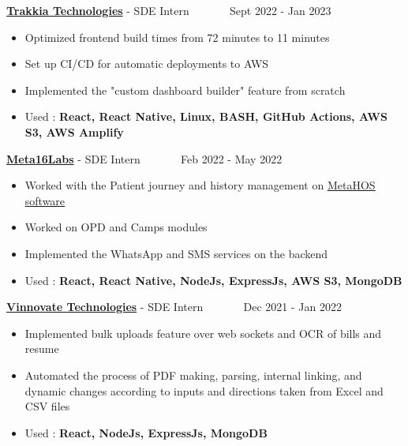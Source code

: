 \documentclass[10pt,a4paper,ragged2e,withhyper]{altacv}
\begin{document}
\begin{paracol}{2}


\large \textcolor{VividPurple}{\href{https://www.trakkia.com}{\textbf{Trakkia Technologies}}} - SDE Intern ~~~~~~ \normalsize \faCalendar Sept 2022 - Jan 2023

\begin{itemize}
  \item Optimized frontend build times from 72 minutes to 11 minutes 
  \item Set up CI/CD for automatic deployments to AWS
  \item Implemented the "custom dashboard builder" feature from scratch
  \item Used : \textcolor{VividPurple}{\textbf{React, React Native, Linux, BASH, GitHub Actions, AWS S3, AWS Amplify}}
\end{itemize}

\divider

\large \textcolor{VividPurple}{\href{https://m16labs.com}{\textbf{Meta16Labs}}} - SDE Intern ~~~~~~ \normalsize \faCalendar Feb 2022 - May 2022

\begin{itemize}
  \item Worked with the Patient journey and history management on \href{https://metahos.com/}{\underline{MetaHOS software}} 
  \item Worked on OPD and Camps modules
  \item Implemented the WhatsApp and SMS services on the backend
  \item Used : \textcolor{VividPurple}{\textbf{React, React Native, NodeJs, ExpressJs, AWS S3, MongoDB }}
\end{itemize}

\divider

\large \textcolor{VividPurple}{\href{https://vinnovatetechnologies.com}{\textbf{Vinnovate Technologies}}} - SDE Intern ~~~~~~ \normalsize \faCalendar Dec 2021 - Jan 2022

\begin{itemize}
  \item Implemented bulk uploads feature over web sockets and OCR of bills and resume
  \item Automated the process of PDF making, parsing, internal linking, and dynamic changes according to inputs and directions taken from Excel and CSV files
  \item Used : \textcolor{VividPurple}{\textbf{React, NodeJs, ExpressJs, MongoDB }}
\end{itemize}


\end{paracol}
\end{document}
